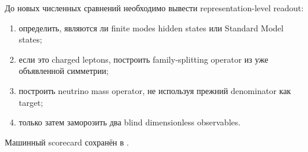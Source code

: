 \begin{protocol}
До новых численных сравнений необходимо вывести representation-level
readout:
\begin{enumerate}
 \item определить, являются ли finite modes hidden states или Standard
 Model states;
 \item если это charged leptons, построить family-splitting operator из
 уже объявленной симметрии;
 \item построить neutrino mass operator, не используя прежний denominator
 как target;
 \item только затем заморозить два blind dimensionless observables.
\end{enumerate}
\end{protocol}

Машинный scorecard сохранён в
.
